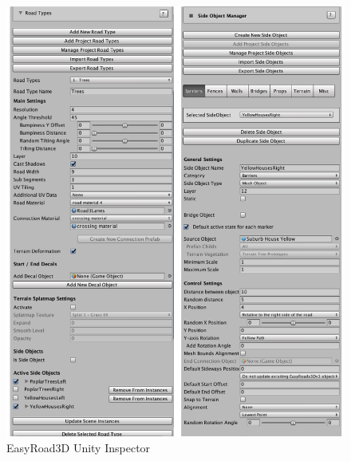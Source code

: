 \begin{figure}[H]
  \centering
  \includegraphics[scale=0.50]{images/Chapter4/easyroad3d.png}
  \caption{EasyRoad3D Unity Inspector}
  \label{fig:remote_ssh}
\end{figure}

